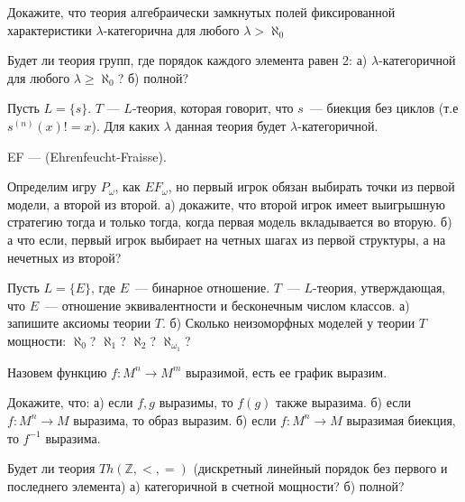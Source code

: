 \setcounter{curtask}{6}


\begin{task}
    Докажите, что теория алгебраически замкнутых полей фиксированной характеристики
    $\lambda$-категорична для любого $\lambda > \aleph_0$
\end{task}

\begin{task}
    Будет ли теория групп, где порядок каждого элемента равен 2:
    а) $\lambda$-категоричной для любого $\lambda \ge \aleph_0$?
    б) полной?
\end{task}

\begin{task}
    Пусть $L = \{s\}$. $T$ --- $L$-теория, которая говорит, что $s$~--- биекция без
	циклов (т.е $s^{(n)}(x) != x$). Для каких $\lambda$ данная теория будет
    $\lambda$-категоричной.
\end{task}

EF --- (Ehrenfeucht-Fraisse).

\begin{task}
    Определим игру $P_{\omega}$, как $EF_{\omega}$, но первый игрок обязан выбирать
    точки из первой модели, а второй из второй.
	а) докажите, что второй игрок имеет выигрышную стратегию тогда и только тогда,
    когда первая модель вкладывается во вторую.
    б) а что если, первый игрок выбирает на четных шагах из первой структуры, а на
    нечетных из второй?
\end{task}

\begin{task}
    Пусть $L = \{E\}$, где $E$~--- бинарное отношение. $T$~--- $L$-теория,
    утверждающая, что $E$~--- отношение эквивалентности и бесконечным числом классов.
    а) запишите аксиомы теории $T$.
    б) Сколько неизоморфных моделей у теории $T$ мощности: $\aleph_0$? $\aleph_1$?
    $\aleph_2$? $\aleph_{\omega_1}$?
\end{task}


\breakline

Назовем функцию $f:M^{n} \to M^{m}$ выразимой, есть ее график выразим.

\begin{ptask}{3}
	Докажите, что:
    а) если $f, g$ выразимы, то $f(g)$ также выразима.
    б) если $f:M^{n} \to M$ выразима, то образ выразим.
    б) если $f:M^{n} \to M$ выразимая биекция, то $f^{-1}$ выразима.
\end{ptask}

\begin{ptask}{4}
    Будет ли теория $Th(\mathbb{Z}, <, =)$ (дискретный линейный порядок
    без первого и последнего элемента)
    а) категоричной в счетной мощности?
    б) полной?
\end{ptask}
